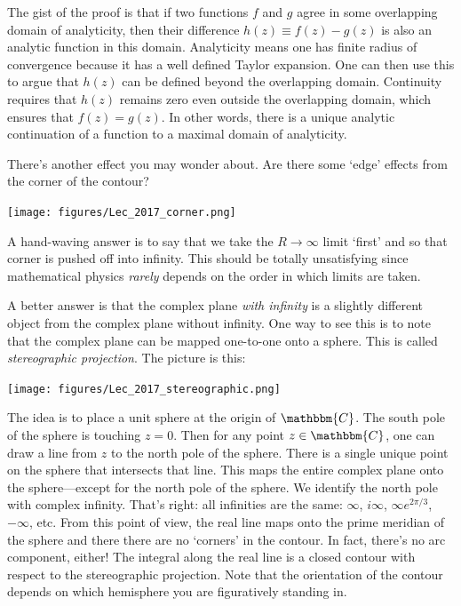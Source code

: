 The gist of the proof is that if two functions $f$ and  $g$ agree in some overlapping domain of analyticity, then their difference $h(z)\equiv f(z)-g(z)$ is also an analytic function in this domain. Analyticity means one has finite radius of convergence because it has a well defined Taylor expansion. One can then use this to argue that $h(z)$ can be defined beyond the overlapping domain. Continuity requires that $h(z)$ remains zero even outside the overlapping domain, which ensures that $f(z)=g(z)$. In other words, there is a unique analytic continuation of a function to a maximal domain of analyticity.

There's another effect you may wonder about. Are there some `edge' effects from the corner of the contour?
\begin{center}
\texttt{[image: figures/Lec\_2017\_corner.png]}
\end{center}
A hand-waving answer is to say that we take the $R\to\infty$ limit `first' and so that corner is pushed off into infinity. This should be totally unsatisfying since mathematical physics \emph{rarely} depends on the order in which limits are taken. 

A better answer is that the complex plane \emph{with infinity} is a slightly different object from the complex plane without infinity. One way to see this is to note that the complex plane can be mapped one-to-one onto a sphere. This is called \emph{stereographic projection}. The picture is this:
\begin{center}
\texttt{[image: figures/Lec\_2017\_stereographic.png]}
\end{center}
The idea is to place a unit sphere at the origin of $\mathbbm{C}$. The south pole of the sphere is touching $z=0$. Then for any point $z\in\mathbbm{C}$, one can draw a line from $z$ to the north pole of the sphere. There is a single unique point on the sphere that intersects that line. This maps the entire complex plane onto the sphere---except for the north pole of the sphere. We identify the north pole with complex infinity. That's right: all infinities are the same: $\infty$, $i\infty$, $\infty e^{2\pi/3}$, $-\infty$, etc. From this point of view, the real line maps onto the prime meridian of the sphere and there there are no `corners' in the contour. In fact, there's no arc component, either! The integral along the real line is a closed contour with respect to the stereographic projection. Note that the orientation of the contour depends on which hemisphere you are figuratively standing in.

